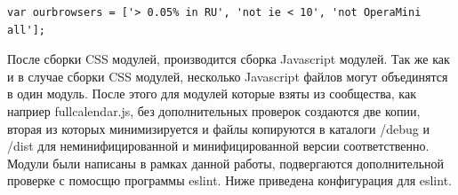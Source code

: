 \begin{small}
\begin{verbatim}
var ourbrowsers = ['> 0.05% in RU', 'not ie < 10', 'not OperaMini all'];
\end{verbatim}
\end{small}


После сборки CSS модулей, производится сборка Javascript модулей. Так же как и в случае сборки CSS модулей, несколько Javascript файлов могут объединятся в один модуль. После этого для модулей которые взяты из сообщества, как наприер fullcalendar.js, без дополнительных проверок создаются две копии, вторая из которых минимизируется и файлы копируются в каталоги /debug и /dist для неминифицированной и минифицированной версии соответственно. Модули были написаны в рамках данной работы, подвергаются дополнительной проверке с помосщю программы eslint. Ниже приведена конфигурация для eslint.  

